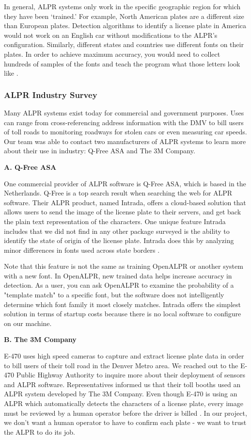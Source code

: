 \documentclass[11pt, oneside, fullpage, doublespace]{article}
\begin{document}
In general, ALPR systems only work in the specific geographic region for which they have been `trained.' For example, North American plates are a different size than European plates. Detection algorithms to identify a license plate in America would not work on an English car without modifications to the ALPR's configuration. Similarly, different states and countries use different fonts on their plates. In order to achieve maximum accuracy, you would need to collect hundreds of samples of the fonts and teach the program what those letters look like \cite{nikolaos2006}.

\subsubsection{ALPR Industry Survey}
Many ALPR systems exist today for commercial and government purposes. Uses can range from cross-referencing address information with the DMV to bill users of toll roads to monitoring roadways for stolen cars or even measuring car speeds. Our team was able to contact two manufacturers of ALPR systems to learn more about their use in industry: Q-Free ASA and The 3M Company.

\textbf{A. Q-Free ASA}

One commercial provider of ALPR software is Q-Free ASA, which is based in the Netherlands. Q-Free is a top search result when searching the web for ALPR software. Their ALPR product, named Intrada, offers a cloud-based solution that allows users to send the image of the license plate to their servers, and get back the plain text representation of the characters. One unique feature Intrada includes that we did not find in any other package surveyed is the ability to identify the state of origin of the license plate. Intrada does this by analyzing minor differences in fonts used across state borders \cite{intrada2014}.

Note that this feature is not the same as training OpenALPR or another system with a new font. In OpenALPR, new trained data helps increase accuracy in detection. As a user, you can ask OpenALPR to examine the probability of a "template match" to a specific font, but the software does not intelligently determine which font family it most closely matches. Intrada offers the simplest solution in terms of startup costs because there is no local software to configure on our machine.

\textbf{B. The 3M Company}

E-470 uses high speed cameras to capture and extract license plate data in order to bill users of their toll road in the Denver Metro area. We reached out to the E-470 Public Highway Authority to inquire more about their deployment of sensors and ALPR software. Representatives informed us that their toll booths used an ALPR system developed by The 3M Company. Even though E-470 is using an ALPR which automatically detects the characters of a license plate, every image must be reviewed by a human operator before the driver is billed \cite{e470}. In our project, we don't want a human operator to have to confirm each plate - we want to trust the ALPR to do its job.
\end{document}
